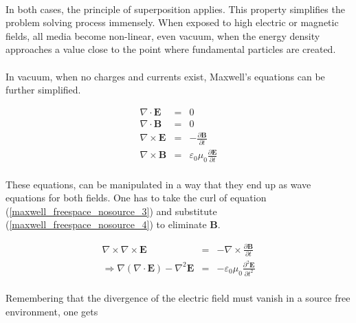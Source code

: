 \documentclass[a4paper,10pt]{thesis}
\begin{document}
\paragraph*{}
In both cases, the principle of superposition applies. This property simplifies the problem solving process immensely. When exposed to high electric or magnetic fields, all media become non-linear, even vacuum, when the energy density approaches a value close to the point where fundamental particles are created.

\paragraph*{}
In vacuum, when no charges and currents exist, Maxwell's equations can be further simplified.

\begin{eqnarray}
\nabla \cdot \mathbf{E}&=& 0 \label{maxwell_freespace_nosource_1}\\
\nabla \cdot \mathbf{B}&=& 0 \label{maxwell_freespace_nosource_2}\\
\nabla \times \mathbf{E}&=& -\frac{\partial \mathbf{B}}{\partial t} \label{maxwell_freespace_nosource_3}\\
\nabla \times \mathbf{B}&=& \varepsilon_0 \mu_0 \frac{\partial \mathbf{E}}{\partial t} \label{maxwell_freespace_nosource_4}
\end{eqnarray}

\paragraph*{}
These equations, can be manipulated in a way that they end up as wave equations for both fields. One has to take the curl of equation (\ref{maxwell_freespace_nosource_3}) and substitute (\ref{maxwell_freespace_nosource_4}) to eliminate \textbf{B}.

\begin{eqnarray}
\nabla \times \nabla \times \mathbf{E}&=& -\nabla \times \frac{\partial \mathbf{B}}{\partial t} \\
\Rightarrow \nabla ( \nabla \cdot \mathbf{E})- \nabla^2 \mathbf{E} &=& - \varepsilon_0 \mu_0 \frac{\partial^2 \mathbf{E}}{\partial t^2}
\end{eqnarray}

\paragraph*{}
Remembering that the divergence of the electric field must vanish in a source free environment, one gets
\end{document}
